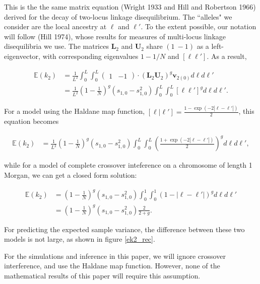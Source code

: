 \documentclass[11pt]{amsart}
\begin{document}
This is the the same matrix equation (Wright 1933 and Hill and Robertson 1966) derived for the decay of two-locus linkage disequilibrium.
The ``alleles" we consider are the local ancestry at $\ell$ and $\ell'$.
To the extent possible, our notation will follow (Hill 1974), whose results for measures of multi-locus linkage disequilibria we use.
The matrices $\mathbf{L}_2$ and $\mathbf{U}_2$ share $(1\ -1)$ as a left-eigenvector, with corresponding eigenvalues $1-1/N$ and $[\ell\ell']$.
As a result,

\begin{align}
	\mathbb{E}(k_2)&=\frac{1}{L^2}\int_0^L\int_0^L\left( \begin{array}{cc}
			1 & -1	\end{array} \right)\cdot\left(\mathbf{L}_2\mathbf{U}_2\right)^g
		\mathbf{v}_{2(0)} d\ell d\ell'\nonumber\\
		&=\frac{1}{L^2}\left(1-\frac{1}{N}\right)^g\left( s_{1,0}-s_{1,0}^2 \right)\int_0^L\int_0^L [\ell\ell']^g d\ell d\ell'.
	\label{k2_pulse}
\end{align}

For a model using the Haldane map function,  $[\ell|\ell']=\frac{1-\exp(-2|\ell-\ell'|)}{2}$, this equation becomes

\begin{align*}
	\mathbb{E}(k_2)&=\frac{1}{L^2}\left(1-\frac{1}{N}\right)^g\left( s_{1,0}-s_{1,0}^2 \right)\int_0^L\int_0^L \left(\frac{1+\exp(-2|\ell-\ell'|)}{2}\right)^g d\ell d\ell',
\end{align*}

 while for a model of complete crossover inteference on a chromosome of length 1 Morgan, we can get a closed form solution:

\begin{align*}
	\mathbb{E}(k_2)&=\left(1-\frac{1}{N}\right)^g\left( s_{1,0}-s_{1,0}^2 \right)\int_0^1\int_0^1 \left(1-|\ell-\ell'|\right)^g d\ell d\ell'\\
	&=\left(1-\frac{1}{N}\right)^g \left(s_{1,0}-s_{1,0}^2\right) \frac{2}{2+g}.
\end{align*}

For predicting the expected sample variance, the difference between these two models is not large, as shown in figure \ref{ek2_rec}.

For the simulations and inference in this paper, we will ignore crossover interference, and use the Haldane map function.
However, none of the mathematical results of this paper will require this assumption.
\end{document}
